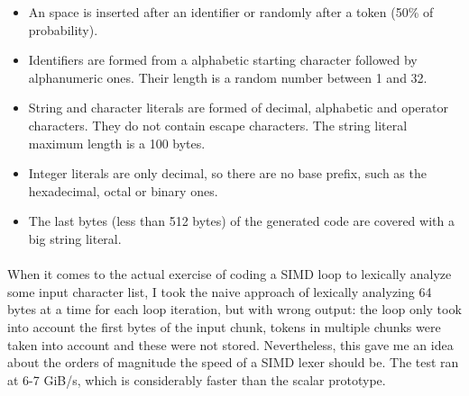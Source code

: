 \documentclass[12pt]{article}
\begin{document}
	\begin{itemize}
		\item An space is inserted after an identifier or randomly after a token (50\% of probability).
		\item Identifiers are formed from a alphabetic starting character followed by alphanumeric ones. Their length is a random number between 1 and 32.
		\item String and character literals are formed of decimal, alphabetic and operator characters. They do not contain escape characters. The string literal maximum length is a 100 bytes.
		\item Integer literals are only decimal, so there are no base prefix, such as the hexadecimal, octal or binary ones.
		\item The last bytes (less than 512 bytes) of the generated code are covered with a big string literal.
	\end{itemize}

	\paragraph{}
	When it comes to the actual exercise of coding a SIMD loop to lexically analyze some input character list, I took the naive approach of lexically analyzing 64 bytes at a time for each loop iteration, but with wrong output: the loop only took into account the first bytes of the input chunk, tokens in multiple chunks were taken into account and these were not stored. Nevertheless, this gave me an idea about the orders of magnitude the speed of a SIMD lexer should be. The test ran at 6-7 GiB/s, which is considerably faster than the scalar prototype.
	
\end{document}
